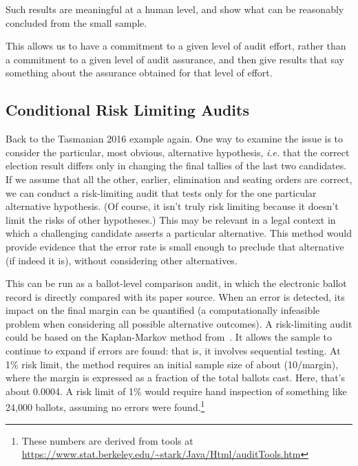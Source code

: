 \documentclass[10pt,a4paper]{article}
\begin{document}
Such results are meaningful at a human level, and show
what can be reasonably concluded from the small sample.

This allows us to have a commitment to a given
level of audit effort, rather than a commitment to a given level
of audit assurance, and then give results that say something about
the assurance obtained for that level of effort.


\subsection{Conditional Risk Limiting Audits} \label{subsec:conditional}

Back to the Tasmanian 2016 example again. One way to examine the issue is to consider the particular, most obvious, alternative hypothesis, {\it i.e.} that the correct election result differs only in changing the final tallies of the last two candidates.  If we assume that all the other, earlier, elimination and seating orders are correct, we can conduct a risk-limiting audit that tests only for the one particular alternative hypothesis.  (Of course, it isn't truly risk limiting because it doesn't limit the risks of other hypotheses.) This may be relevant in a legal context in which a challenging candidate 
asserts a particular alternative. This method would provide evidence that the error rate is small enough to preclude that alternative (if indeed it is), without considering other alternatives.

This can be run as a ballot-level comparison audit, in which the electronic ballot record is directly compared with its paper source.  When an error is detected, its impact on the final margin can be quantified  (a computationally infeasible problem when considering all possible alternative outcomes).  
A risk-limiting audit could be based on the Kaplan-Markov  method from~\cite{stark2008conservative}.  It allows the sample to continue to expand if errors are found: that is, it involves sequential testing. 
At 1\% risk limit, the method requires an initial sample size of about (10/margin), where the margin is expressed as a fraction of the total ballots cast. Here, that's about 0.0004.
A risk limit of 1\% would require hand inspection of something like 24,000 ballots, assuming no errors were found.\footnote{These numbers are derived from tools at {\url{https://www.stat.berkeley.edu/~stark/Java/Html/auditTools.htm}} } 
\end{document}
